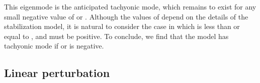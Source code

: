 \documentclass[a4paper,showpacs,preprintnumbers,amsmath,amssymb]{revtex4}
\begin{document}
This eigenmode is the anticipated tachyonic mode, which remains to exist for any small negative value of \myHighlight{$\lambda_+$}\coordHE{} or \myHighlight{$\lambda_-$}\coordHE{}. 
Although the values of \myHighlight{$\lambda_\pm$}\coordHE{} depend on the details of the stabilization model, it is natural to consider the case in which  \myHighlight{$|\lambda_\pm|$}\coordHE{} is less than or equal to \coordHE{}, and \myHighlight{$\lambda_\pm$}\coordHE{} must be positive.  To conclude, we find that the model has tachyonic mode if \myHighlight{$\lambda_+$}\coordHE{} or \myHighlight{$\lambda_-$}\coordHE{} is negative.



\subsection{Linear perturbation}
 
\end{document}
